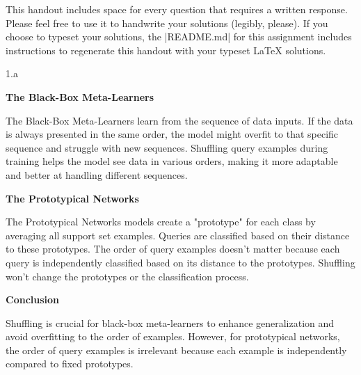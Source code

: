 

\def\assignmentnum{3 }
\def\assignmenttitle{XCS330 Problem Set \assignmentnum}


\pagestyle{myheadings} \markboth{}{\assignmenttitle}


This handout includes space for every question that requires a written response.
Please feel free to use it to handwrite your solutions (legibly, please).  If
you choose to typeset your solutions, the |README.md| for this assignment includes
instructions to regenerate this handout with your typeset \LaTeX{} solutions.

\LARGE
1.a
\normalsize

\begin{answer}
\textbf{The Black-Box Meta-Learners}

The Black-Box Meta-Learners learn from the sequence of data inputs. If the data is always presented in the same order, the model might overfit to that specific sequence and struggle with new sequences. Shuffling query examples during training helps the model see data in various orders, making it more adaptable and better at handling different sequences.

\textbf{The Prototypical Networks}

The Prototypical Networks models create a "prototype" for each class by averaging all support set examples. Queries are classified based on their distance to these prototypes. The order of query examples doesn't matter because each query is independently classified based on its distance to the prototypes. Shuffling won't change the prototypes or the classification process.

\textbf{Conclusion}

Shuffling is crucial for black-box meta-learners to enhance generalization and avoid overfitting to the order of examples. However, for prototypical networks, the order of query examples is irrelevant because each example is independently compared to fixed prototypes.

\end{answer}


